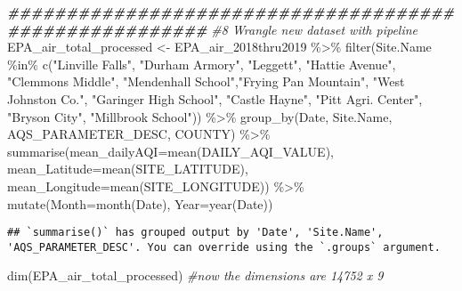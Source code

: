 \documentclass[
]{article}
\newenvironment{Shaded}{\begin{snugshade}}{\end{snugshade}}
\newcommand{\AttributeTok}[1]{\textcolor[rgb]{0.77,0.63,0.00}{#1}}
\newcommand{\CommentTok}[1]{\textcolor[rgb]{0.56,0.35,0.01}{\textit{#1}}}
\newcommand{\DocumentationTok}[1]{\textcolor[rgb]{0.56,0.35,0.01}{\textbf{\textit{#1}}}}
\newcommand{\FunctionTok}[1]{\textcolor[rgb]{0.00,0.00,0.00}{#1}}
\newcommand{\NormalTok}[1]{#1}
\newcommand{\OtherTok}[1]{\textcolor[rgb]{0.56,0.35,0.01}{#1}}
\newcommand{\SpecialCharTok}[1]{\textcolor[rgb]{0.00,0.00,0.00}{#1}}
\newcommand{\StringTok}[1]{\textcolor[rgb]{0.31,0.60,0.02}{#1}}
\begin{document}
\begin{Shaded}
\begin{Highlighting}[]
\DocumentationTok{\#\#\#\#\#\#\#\#\#\#\#\#\#\#\#\#\#\#\#\#\#\#\#\#\#\#\#\#\#\#\#\#\#\#\#\#\#\#\#\#\#\#\#\#\#\#\#\#\#\#\#\#\#\#\#}
\CommentTok{\#8 Wrangle new dataset with pipeline}
\NormalTok{EPA\_air\_total\_processed }\OtherTok{\textless{}{-}}\NormalTok{ EPA\_air\_2018thru2019 }\SpecialCharTok{\%\textgreater{}\%} 
  \FunctionTok{filter}\NormalTok{(Site.Name }\SpecialCharTok{\%in\%} \FunctionTok{c}\NormalTok{(}\StringTok{"Linville Falls"}\NormalTok{, }\StringTok{"Durham Armory"}\NormalTok{, }
                                  \StringTok{"Leggett"}\NormalTok{, }\StringTok{"Hattie Avenue"}\NormalTok{, }\StringTok{"Clemmons Middle"}\NormalTok{, }
                                \StringTok{"Mendenhall School"}\NormalTok{,}\StringTok{"Frying Pan Mountain"}\NormalTok{, }
                                \StringTok{"West Johnston Co."}\NormalTok{, }\StringTok{"Garinger High School"}\NormalTok{, }
                                \StringTok{"Castle Hayne"}\NormalTok{, }\StringTok{"Pitt Agri. Center"}\NormalTok{, }\StringTok{"Bryson City"}\NormalTok{, }
                                \StringTok{"Millbrook School"}\NormalTok{)) }\SpecialCharTok{\%\textgreater{}\%}
  \FunctionTok{group\_by}\NormalTok{(Date, Site.Name, AQS\_PARAMETER\_DESC, COUNTY) }\SpecialCharTok{\%\textgreater{}\%}
  \FunctionTok{summarise}\NormalTok{(}\AttributeTok{mean\_dailyAQI=}\FunctionTok{mean}\NormalTok{(DAILY\_AQI\_VALUE),}
            \AttributeTok{mean\_Latitude=}\FunctionTok{mean}\NormalTok{(SITE\_LATITUDE),}
            \AttributeTok{mean\_Longitude=}\FunctionTok{mean}\NormalTok{(SITE\_LONGITUDE)) }\SpecialCharTok{\%\textgreater{}\%}
  \FunctionTok{mutate}\NormalTok{(}\AttributeTok{Month=}\FunctionTok{month}\NormalTok{(Date), }\AttributeTok{Year=}\FunctionTok{year}\NormalTok{(Date))}
\end{Highlighting}
\end{Shaded}

\begin{verbatim}
## `summarise()` has grouped output by 'Date', 'Site.Name', 'AQS_PARAMETER_DESC'. You can override using the `.groups` argument.
\end{verbatim}

\begin{Shaded}
\begin{Highlighting}[]
\FunctionTok{dim}\NormalTok{(EPA\_air\_total\_processed) }\CommentTok{\#now the dimensions are 14752 x 9 }
\end{Highlighting}
\end{Shaded}
\end{document}
